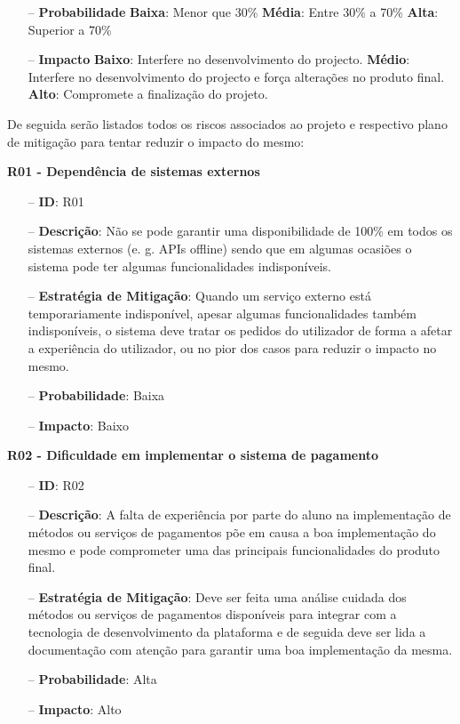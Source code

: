 \begin{itemize}
	\item[--] \textbf{Probabilidade}
		\subitem \textbf{Baixa}: Menor que 30\%
		\subitem \textbf{Média}: Entre 30\% a 70\%
		\subitem \textbf{Alta}: Superior a 70\%
	\item[--] \textbf{Impacto}
		\subitem \textbf{Baixo}: Interfere no desenvolvimento do projecto.
		\subitem \textbf{Médio}: Interfere no desenvolvimento do projecto e força alterações no produto final.
		\subitem \textbf{Alto}: Compromete a finalização do projeto.
\end{itemize}

De seguida serão listados todos os riscos associados ao projeto e respectivo plano de mitigação para tentar reduzir o impacto do mesmo:

\textbf{R01 - Dependência de sistemas externos}
\begin{itemize}
	\item[--] \textbf{ID}: R01
	\item[--] \textbf{Descrição}: Não se pode garantir uma disponibilidade de 100\% em todos os sistemas externos (e. g. APIs offline) sendo que em algumas ocasiões o sistema pode ter algumas funcionalidades indisponíveis.
	\item[--] \textbf{Estratégia de Mitigação}: Quando um serviço externo está temporariamente indisponível, apesar algumas funcionalidades também indisponíveis, o sistema deve tratar os pedidos do utilizador de forma a afetar a experiência do utilizador, ou no pior dos casos para reduzir o impacto no mesmo.
	\item[--] \textbf{Probabilidade}: Baixa
	\item[--] \textbf{Impacto}: Baixo
\end{itemize}

\textbf{R02 - Dificuldade em implementar o sistema de pagamento}
\begin{itemize}
	\item[--] \textbf{ID}: R02
	\item[--] \textbf{Descrição}: A falta de experiência por parte do aluno na implementação de métodos ou serviços de pagamentos põe em causa a boa implementação do mesmo e pode comprometer uma das principais funcionalidades do produto final.
	\item[--] \textbf{Estratégia de Mitigação}: Deve ser feita uma análise cuidada dos métodos ou serviços de pagamentos disponíveis para integrar com a tecnologia de desenvolvimento da plataforma e de seguida deve ser lida a documentação com atenção para garantir uma boa implementação da mesma.
	\item[--] \textbf{Probabilidade}: Alta
	\item[--] \textbf{Impacto}: Alto
\end{itemize}

